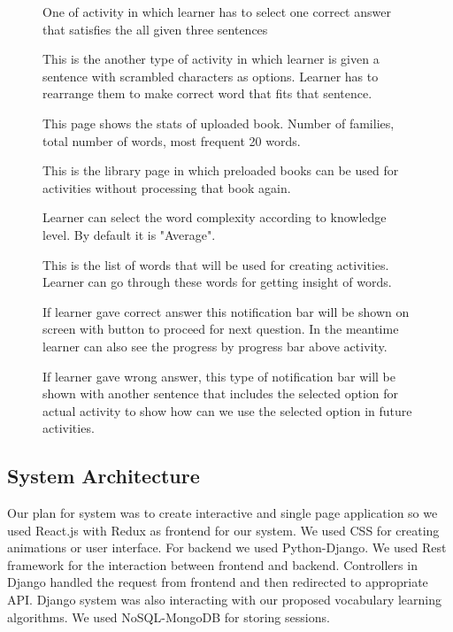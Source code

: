 \documentclass[11pt,a4paper]{article}
\begin{document}
\begin{figure}
\begin{tcbraster}[raster columns=1, enhanced, blankest]
\caption{One of activity in which learner has to select one correct answer that satisfies the all given three sentences}

\caption{This is the another type of activity in which learner is given a sentence with scrambled characters as options. Learner has to rearrange them to make correct word that fits that sentence.}

\caption{This page shows the stats of uploaded book. Number of families, total number of words, most frequent 20 words.}


\caption{This is the library page in which preloaded books can be used for activities without processing that book again.}

\end{tcbraster}
\end{figure}



\begin{figure}
\begin{tcbraster}[raster columns=1, enhanced, blankest]
\caption{Learner can select the word complexity according to knowledge level. By default it is "Average".}


\caption{This is the list of words that will be used for creating activities. Learner can go through these words for getting insight of words.}

\caption{If learner gave correct answer this notification bar will be shown on screen with button to proceed for next question. In the meantime learner can also see the progress by progress bar above activity.}

\caption{If learner gave wrong answer, this type of notification bar will be shown with another sentence that includes the selected option for actual activity to show how can we use the selected option in future activities.}
\end{tcbraster}
\end{figure}




\subsection{System Architecture}
Our plan for system was to create interactive and single page application so we used React.js with Redux as frontend for our system. We used CSS for creating animations or user interface. For backend we used Python-Django. We used Rest framework for the interaction between frontend and backend. Controllers in Django handled the request from frontend and then redirected to appropriate API. Django system was also interacting with our proposed vocabulary learning algorithms. We used NoSQL-MongoDB for storing sessions.   
\end{document}
